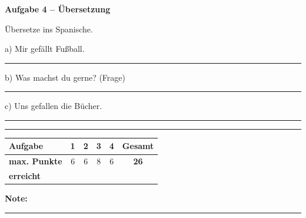 \documentclass[11pt, a4paper]{article}
\newcommand{\fachfarbe}{spanisch}
\newcommand{\punktebox}[1]{\hfill\fbox{\small \_/#1}}
\newcommand{\luecke}[1]{\rule{#1}{0.4pt}}
\newenvironment{aufgabe}[1]{%
    \needspace{5\baselineskip}%
    \nopagebreak[4]%
    \vspace{10pt}
    \noindent\textbf{\textcolor{\fachfarbe}{Aufgabe #1}}
    \nopagebreak[4]%
    \vspace{5pt}
    \nopagebreak[4]%
    \begin{list}{}{\leftmargin=0pt}
    \item[]
}{%
    \end{list}
}
\begin{document}
\begin{aufgabe}{4 -- Übersetzung}
Übersetze ins Spanische. \punktebox{6}
\end{aufgabe}

\noindent
a) Mir gefällt Fußball.

\luecke{10cm}

\vspace{1em}

\noindent
b) Was machst du gerne? (Frage)

\luecke{10cm}

\vspace{1em}

\noindent
c) Uns gefallen die Bücher.

\luecke{10cm}


\vspace{25pt}
\hrule
\vspace{10pt}

\noindent
\begin{tabularx}{\textwidth}{|X|c|c|c|c||c|}
\hline
\textbf{Aufgabe} & 1 & 2 & 3 & 4 & \textbf{Gesamt} \\
\hline
\textbf{max. Punkte} & 6 & 6 & 8 & 6 & \textbf{26} \\
\hline
\textbf{erreicht} & & & & & \\[0.8em]
\hline
\end{tabularx}

\vspace{10pt}

\begin{flushright}
\textbf{Note:} \luecke{2cm}
\end{flushright}
\end{document}
